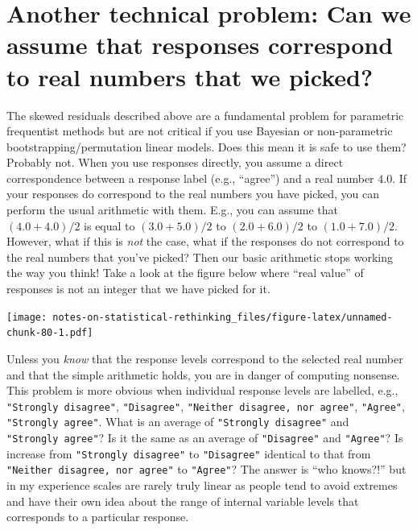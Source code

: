 \documentclass[
]{book}
\begin{document}
\hypertarget{another-technical-problem-can-we-assume-that-responses-correspond-to-real-numbers-that-we-picked}{%
\section{Another technical problem: Can we assume that responses correspond to real numbers that we picked?}\label{another-technical-problem-can-we-assume-that-responses-correspond-to-real-numbers-that-we-picked}}

The skewed residuals described above are a fundamental problem for parametric frequentist methods but are not critical if you use Bayesian or non-parametric bootstrapping/permutation linear models. Does this mean it is safe to use them? Probably not. When you use responses directly, you assume a direct correspondence between a response label (e.g., ``agree'') and a real number \(4.0\). If your responses do correspond to the real numbers you have picked, you can perform the usual arithmetic with them. E.g., you can assume that \((4.0 + 4.0) / 2\) is equal to \((3.0 + 5.0) / 2\) to \((2.0 + 6.0) / 2\) to \((1.0 + 7.0)/ 2\). However, what if this is \emph{not} the case, what if the responses do not correspond to the real numbers that you've picked? Then our basic arithmetic stops working the way you think! Take a look at the figure below where ``real value'' of responses is not an integer that we have picked for it.

\texttt{[image: notes-on-statistical-rethinking\_files/figure-latex/unnamed-chunk-80-1.pdf]}

Unless you \emph{know} that the response levels correspond to the selected real number and that the simple arithmetic holds, you are in danger of computing nonsense. This problem is more obvious when individual response levels are labelled, e.g., \texttt{"Strongly\ disagree"}, \texttt{"Disagree"}, \texttt{"Neither\ disagree,\ nor\ agree"}, \texttt{"Agree"}, \texttt{"Strongly\ agree"}. What is an average of \texttt{"Strongly\ disagree"} and \texttt{"Strongly\ agree"}? Is it the same as an average of \texttt{"Disagree"} and \texttt{"Agree"}? Is increase from \texttt{"Strongly\ disagree"} to \texttt{"Disagree"} identical to that from \texttt{"Neither\ disagree,\ nor\ agree"} to \texttt{"Agree"}? The answer is ``who knows?!'' but in my experience scales are rarely truly linear as people tend to avoid extremes and have their own idea about the range of internal variable levels that corresponds to a particular response.
\end{document}
